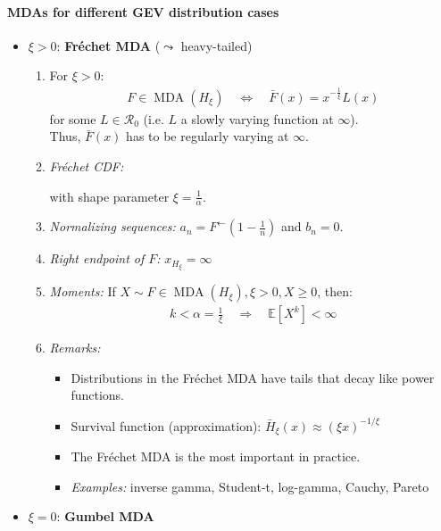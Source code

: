 \documentclass[a4paper,landscape,8pt,fleqn]{scrartcl}
\newcommand*\widefbox[1]{\fbox{\hspace{2em}#1\hspace{2em}}}		%
\renewcommand{\emph}[1]{\textbf{#1}}
\DeclareMathOperator{\MDA}{MDA}			%
\begin{document}
\begin{multicols*}{3}
\paragraph{MDAs for different GEV distribution cases}
\begin{itemize}
\item $\xi > 0$: \emph{Fréchet MDA} ($\leadsto$ heavy-tailed)
\begin{enumerate}
\item For $\xi > 0$:
\begin{align*}
F \in \MDA(H_\xi) \quad \iff \quad \bar F(x) = x^{-\frac{1}{\xi}} L(x)
\end{align*}
for some $L \in \mathcal{R}_0$ (i.e. $L$ a slowly varying function at $\infty$). \\
Thus, $\bar F(x)$ has to be regularly varying at $\infty$.
\item \textit{Fréchet CDF:}
with shape parameter $\xi = \frac{1}{\alpha}$.
\item \textit{Normalizing sequences:} $a_n = F^\leftarrow(1-\frac{1}{n})$ and $b_n = 0$.
\item \textit{Right endpoint of $F$:} $x_{H_\xi} = \infty$
\item \textit{Moments:} If $X \sim F \in \MDA(H_\xi), \xi > 0, X \geq 0$, then:
\begin{align*}
k < \alpha = \frac{1}{\xi} \quad \Rightarrow \quad \mathbb{E}[X^k] < \infty
\end{align*}
\item \textit{Remarks:}
\begin{itemize}
\item Distributions in the Fréchet MDA have tails that decay like power functions.
\item Survival function (approximation): $\bar H_\xi(x) \approx (\xi x)^{-1/\xi}$
\item The Fréchet MDA is the most important in practice.
\item \textit{Examples:} inverse gamma, Student-t, log-gamma, Cauchy, Pareto
\end{itemize}
\end{enumerate}
\item $\xi = 0$: \emph{Gumbel MDA} \\

\end{itemize}
\end{multicols*}
\end{document}
